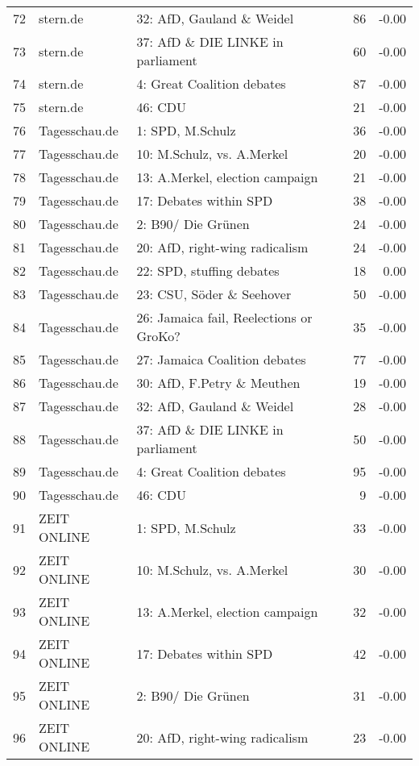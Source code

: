 \begin{table}[ht]
\begin{adjustbox}{width=\textwidth,totalheight=\textheight,keepaspectratio}
\begin{tabular}{rllrr}
  72 & stern.de & 32: AfD, Gauland \& Weidel &  86 & -0.00 \\ 
  73 & stern.de & 37: AfD \& DIE LINKE in parliament &  60 & -0.00 \\ 
  74 & stern.de & 4: Great Coalition debates &  87 & -0.00 \\ 
  75 & stern.de & 46: CDU &  21 & -0.00 \\ 
  76 & Tagesschau.de & 1: SPD, M.Schulz &  36 & -0.00 \\ 
  77 & Tagesschau.de & 10: M.Schulz, vs. A.Merkel &  20 & -0.00 \\ 
  78 & Tagesschau.de & 13: A.Merkel, election campaign &  21 & -0.00 \\ 
  79 & Tagesschau.de & 17: Debates within SPD &  38 & -0.00 \\ 
  80 & Tagesschau.de & 2: B90/ Die Grünen &  24 & -0.00 \\ 
  81 & Tagesschau.de & 20: AfD, right-wing radicalism &  24 & -0.00 \\ 
  82 & Tagesschau.de & 22: SPD, stuffing debates &  18 & 0.00 \\ 
  83 & Tagesschau.de & 23: CSU, Söder \& Seehover &  50 & -0.00 \\ 
  84 & Tagesschau.de & 26: Jamaica fail, Reelections or GroKo? &  35 & -0.00 \\ 
  85 & Tagesschau.de & 27: Jamaica Coalition debates &  77 & -0.00 \\ 
  86 & Tagesschau.de & 30: AfD, F.Petry \& Meuthen &  19 & -0.00 \\ 
  87 & Tagesschau.de & 32: AfD, Gauland \& Weidel &  28 & -0.00 \\ 
  88 & Tagesschau.de & 37: AfD \& DIE LINKE in parliament &  50 & -0.00 \\ 
  89 & Tagesschau.de & 4: Great Coalition debates &  95 & -0.00 \\ 
  90 & Tagesschau.de & 46: CDU &   9 & -0.00 \\ 
  91 & ZEIT ONLINE & 1: SPD, M.Schulz &  33 & -0.00 \\ 
  92 & ZEIT ONLINE & 10: M.Schulz, vs. A.Merkel &  30 & -0.00 \\ 
  93 & ZEIT ONLINE & 13: A.Merkel, election campaign &  32 & -0.00 \\ 
  94 & ZEIT ONLINE & 17: Debates within SPD &  42 & -0.00 \\ 
  95 & ZEIT ONLINE & 2: B90/ Die Grünen &  31 & -0.00 \\ 
  96 & ZEIT ONLINE & 20: AfD, right-wing radicalism &  23 & -0.00 \\ 

\end{tabular}
\end{adjustbox}
\end{table}
